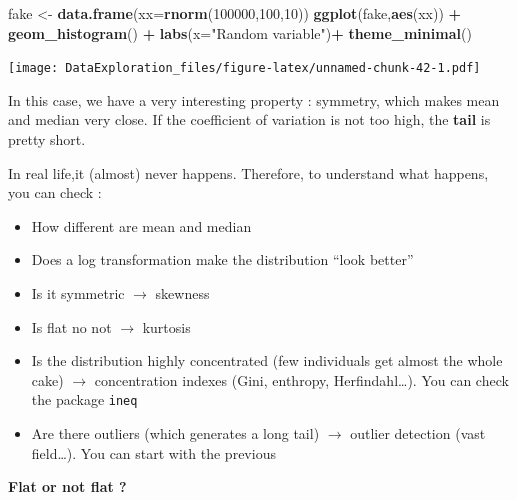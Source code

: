 \documentclass[
]{book}
\newenvironment{Shaded}{\begin{snugshade}}{\end{snugshade}}
\newcommand{\DataTypeTok}[1]{\textcolor[rgb]{0.13,0.29,0.53}{#1}}
\newcommand{\DecValTok}[1]{\textcolor[rgb]{0.00,0.00,0.81}{#1}}
\newcommand{\KeywordTok}[1]{\textcolor[rgb]{0.13,0.29,0.53}{\textbf{#1}}}
\newcommand{\NormalTok}[1]{#1}
\newcommand{\OperatorTok}[1]{\textcolor[rgb]{0.81,0.36,0.00}{\textbf{#1}}}
\newcommand{\StringTok}[1]{\textcolor[rgb]{0.31,0.60,0.02}{#1}}
\providecommand{\tightlist}{%
  \setlength{\itemsep}{0pt}\setlength{\parskip}{0pt}}
\begin{document}
\begin{Shaded}
\begin{Highlighting}[]
\NormalTok{fake <-}\StringTok{ }\KeywordTok{data.frame}\NormalTok{(}\DataTypeTok{xx=}\KeywordTok{rnorm}\NormalTok{(}\DecValTok{100000}\NormalTok{,}\DecValTok{100}\NormalTok{,}\DecValTok{10}\NormalTok{))}
\KeywordTok{ggplot}\NormalTok{(fake,}\KeywordTok{aes}\NormalTok{(xx)) }\OperatorTok{+}\StringTok{ }\KeywordTok{geom_histogram}\NormalTok{() }\OperatorTok{+}\StringTok{ }\KeywordTok{labs}\NormalTok{(}\DataTypeTok{x=}\StringTok{"Random variable"}\NormalTok{)}\OperatorTok{+}\StringTok{ }\KeywordTok{theme_minimal}\NormalTok{()}
\end{Highlighting}
\end{Shaded}

\texttt{[image: DataExploration\_files/figure-latex/unnamed-chunk-42-1.pdf]}

In this case, we have a very interesting property : symmetry, which makes mean and median very close. If the coefficient of variation is not too high, the \textbf{tail} is pretty short.

In real life,it (almost) never happens. Therefore, to understand what happens, you can check :

\begin{itemize}
\tightlist
\item
  How different are mean and median
\item
  Does a log transformation make the distribution ``look better''
\item
  Is it symmetric \(\rightarrow\) skewness
\item
  Is flat no not \(\rightarrow\) kurtosis
\item
  Is the distribution highly concentrated (few individuals get almost the whole cake) \(\rightarrow\) concentration indexes (Gini, enthropy, Herfindahl\ldots). You can check the package \texttt{ineq}
\item
  Are there outliers (which generates a long tail) \(\rightarrow\) outlier detection (vast field\ldots). You can start with the previous
\end{itemize}

\textbf{Flat or not flat ?}

\begin{Shaded}
\end{Shaded}
\end{document}
